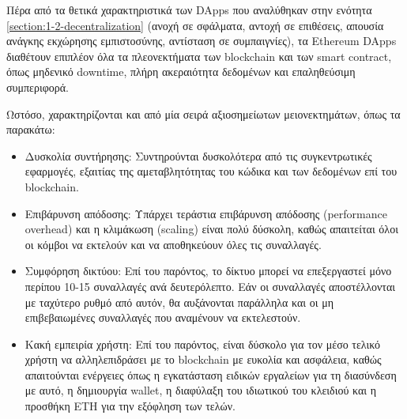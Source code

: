 Πέρα από τα θετικά χαρακτηριστικά των DApps που αναλύθηκαν στην ενότητα \ref{section:1-2-decentralization} (ανοχή σε σφάλματα, αντοχή σε επιθέσεις, απουσία ανάγκης εκχώρησης εμπιστοσύνης, αντίσταση σε συμπαιγνίες), τα Ethereum DApps διαθέτουν επιπλέον όλα τα πλεονεκτήματα των blockchain και των smart contract, όπως μηδενικό downtime, πλήρη ακεραιότητα δεδομένων και επαληθεύσιμη συμπεριφορά.

Ωστόσο, χαρακτηρίζονται και από μία σειρά αξιοσημείωτων μειονεκτημάτων, όπως τα παρακάτω:
\begin{itemize}
	\item Δυσκολία συντήρησης: Συντηρούνται δυσκολότερα από τις συγκεντρωτικές εφαρμογές, εξαιτίας της αμεταβλητότητας του κώδικα και των δεδομένων επί του blockchain. 
	\item Επιβάρυνση απόδοσης: Υπάρχει τεράστια επιβάρυνση απόδοσης (performance overhead) και η κλιμάκωση (scaling) είναι πολύ δύσκολη, καθώς απαιτείται όλοι οι κόμβοι να εκτελούν και να αποθηκεύουν όλες τις συναλλαγές.
	\item Συμφόρηση δικτύου: Επί του παρόντος, το δίκτυο μπορεί να επεξεργαστεί μόνο περίπου 10-15 συναλλαγές ανά δευτερόλεπτο. Εάν οι συναλλαγές αποστέλλονται με ταχύτερο ρυθμό από αυτόν, θα αυξάνονται παράλληλα και οι μη επιβεβαιωμένες συναλλαγές που αναμένουν να εκτελεστούν.
	\item Κακή εμπειρία χρήστη: Επί του παρόντος, είναι δύσκολο για τον μέσο τελικό χρήστη να αλληλεπιδράσει με το blockchain με ευκολία και ασφάλεια, καθώς απαιτούνται ενέργειες όπως η εγκατάσταση ειδικών εργαλείων για τη διασύνδεση με αυτό, η δημιουργία wallet, η διαφύλαξη του ιδιωτικού του κλειδιού και η προσθήκη ETH για την εξόφληση των τελών.
\end{itemize}

